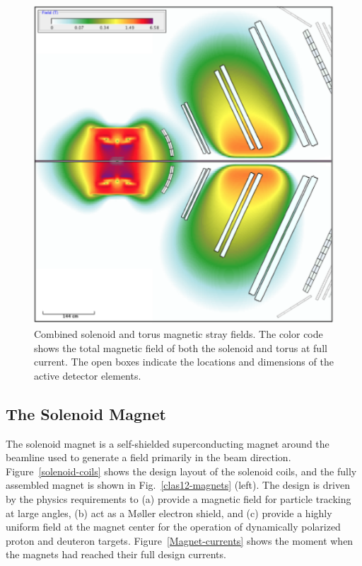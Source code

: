 \documentclass[final,3p,twocolumn]{elsarticle}
\begin{document}
\begin{figure}[th!]
\vspace{0.5cm}
\centerline{\includegraphics[width=0.9\columnwidth]{magfield-2.png}}
\caption{Combined solenoid and torus magnetic stray fields. The color code shows the total magnetic field of both
  the solenoid and torus at full current. The open boxes indicate the locations and dimensions of the active detector
  elements.}
\label{stray-field}
\end{figure}


\subsection{The Solenoid Magnet}

The solenoid magnet is a self-shielded superconducting magnet around the beamline used to generate a field
primarily in the beam direction. Figure~\ref{solenoid-coils} shows the design layout of the solenoid coils, and the
fully assembled magnet is shown in Fig.~\ref{clas12-magnets} (left). The design is driven by the physics
requirements to (a) provide a magnetic field for particle tracking at large angles, (b) act as a M{\o}ller electron
shield, and (c) provide a highly uniform field at the magnet center for the operation of dynamically polarized
proton and deuteron targets.
Figure~\ref{Magnet-currents} shows the moment when the magnets had reached their full design currents.   
\end{document}
